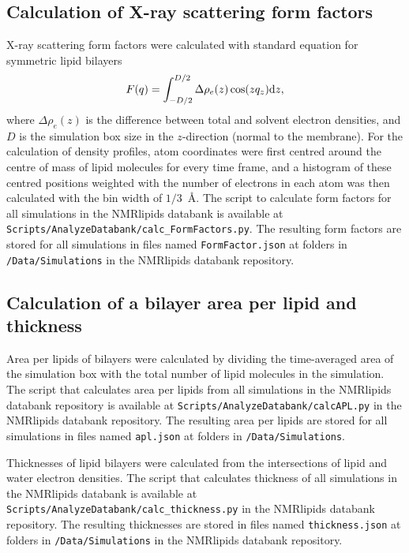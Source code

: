 \documentclass[fleqn,10pt]{wlscirep}
\begin{document}
\subsection{Calculation of X-ray scattering form factors}
X-ray scattering form factors were calculated with standard equation for symmetric lipid bilayers~\cite{ollila16}
\begin{equation}\label{FFsimpl}
F(q)=\int_{-D/2}^{D/2}\Delta \rho_e(z) \cos(zq_z) {\rm d}z,
\end{equation}
where $\Delta \rho_e(z)$ is the difference between total and solvent electron densities, and $D$ is the simulation box size in the $z$-direction (normal to the membrane). For the calculation of density profiles, atom coordinates were first centred around the centre of mass of lipid molecules for every time frame, and a histogram of these centred positions weighted with the number of electrons in each atom was then calculated with the bin width of $1/3$~\AA{}. 
The script to calculate form factors for all simulations in the NMRlipids databank is available at \texttt{Scripts/AnalyzeDatabank/calc\_FormFactors.py}. The resulting form factors are stored for all simulations in files named \texttt{FormFactor.json} at folders in \texttt{/Data/Simulations} in the NMRlipids databank repository.

\subsection{Calculation of a bilayer area per lipid and thickness}
Area per lipids of bilayers were calculated by dividing the time-averaged area of the simulation box with the total number of lipid molecules in the simulation. The script that calculates area per lipids from all simulations in the NMRlipids databank repository is available at \texttt{Scripts/AnalyzeDatabank/calcAPL.py} in the NMRlipids databank repository. The resulting area per lipids are stored for all simulations in files named \texttt{apl.json} at folders in \texttt{/Data/Simulations}. 

Thicknesses of lipid bilayers were calculated from the intersections of lipid and water electron densities. The script that calculates thickness of all simulations in the NMRlipids databank is available at \texttt{Scripts/AnalyzeDatabank/calc\_thickness.py} in the NMRlipids databank repository. The resulting thicknesses are stored in files named \texttt{thickness.json} at folders in \texttt{/Data/Simulations} in the NMRlipids databank repository. 
\end{document}
